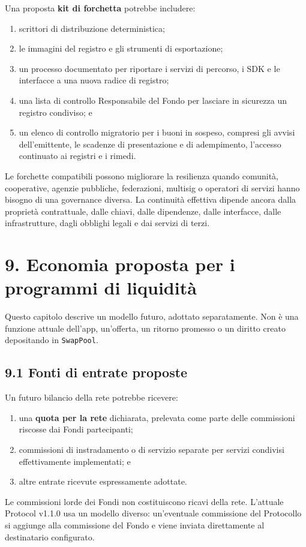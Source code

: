 \documentclass[11pt]{article}
\begin{document}
Una proposta \textbf{kit di forchetta} potrebbe includere:

\begin{enumerate}[leftmargin=*]
\item scrittori di distribuzione deterministica;
\item le immagini del registro e gli strumenti di esportazione;
\item un processo documentato per riportare i servizi di percorso, i SDK e le interfacce a una nuova radice di registro;
\item una lista di controllo Responsabile del Fondo per lasciare in sicurezza un registro condiviso; e
\item un elenco di controllo migratorio per i buoni in sospeso, compresi gli avvisi dell'emittente, le scadenze di presentazione e di adempimento, l'accesso continuato ai registri e i rimedi.
\end{enumerate}
Le forchette compatibili possono migliorare la resilienza quando comunità, cooperative, agenzie pubbliche, federazioni, multisig o operatori di servizi hanno bisogno di una governance diversa. La continuità effettiva dipende ancora dalla proprietà contrattuale, dalle chiavi, dalle dipendenze, dalle interfacce, dalle infrastrutture, dagli obblighi legali e dai servizi di terzi.


\section*{9. Economia proposta per i programmi di liquidità}

Questo capitolo descrive un modello futuro, adottato separatamente. Non è una funzione attuale dell'app, un'offerta, un ritorno promesso o un diritto creato depositando in \texttt{SwapPool}.

\subsection*{9.1 Fonti di entrate proposte}

Un futuro bilancio della rete potrebbe ricevere:

\begin{enumerate}[leftmargin=*]
\item una \textbf{quota per la rete} dichiarata, prelevata come parte delle commissioni riscosse dai Fondi partecipanti;
\item commissioni di instradamento o di servizio separate per servizi condivisi effettivamente implementati; e
\item altre entrate ricevute espressamente adottate.
\end{enumerate}
Le commissioni lorde dei Fondi non costituiscono ricavi della rete. L'attuale Protocol v1.1.0 usa un modello diverso: un'eventuale commissione del Protocollo si aggiunge alla commissione del Fondo e viene inviata direttamente al destinatario configurato.
\end{document}
